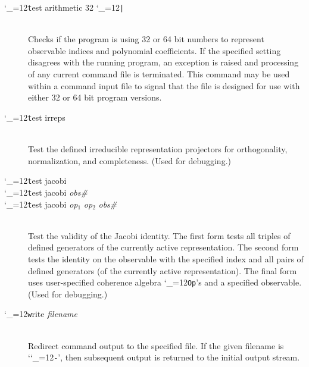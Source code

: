 \documentclass [12pt]{article}
\makeatletter
\renewcommand{\tt}{\begingroup\catcode`_=12\def\_{\string_}\tt@}
\newcommand{\tt@}[1]{\texttt{#1}\endgroup}
\makeatother
\begin{document}
\begin{description}
\item [\tt test arithmetic 32 \tt{|} 64]~\\
    Checks if the program is using 32 or 64 bit numbers
    to represent observable indices and polynomial coefficients.
    If the specified setting disagrees with the running program,
    an exception is raised and processing of any current command
    file is terminated.
    This command
    may be used within a command input file to signal that the file
    is designed for use with either 32 or 64 bit program versions.

\item [\tt test irreps]~\\
    Test the defined irreducible representation projectors for
    orthogonality, normalization, and completeness.
    (Used for debugging.)

\item [\tt test jacobi] \bgroup \itemsep 0pt \parskip 0pt
\item [\tt test jacobi {\it obs\#}]
\item [\tt test jacobi {\it op$_1$} {\it op$_2$} {\it obs\#}]~\\
    Test the validity of the Jacobi identity.
    The first form tests all triples of defined generators
    of the currently active representation.
    The second form tests the identity on the 
    observable with the specified index and all pairs
    of defined generators (of the currently active
    representation).
    The final form uses user-specified
    coherence algebra \tt{Op}'s and a specified observable.
    (Used for debugging.)
\egroup

\item [\tt write {\it filename}]~\\
    Redirect command output to the specified file.
    If the given filename is `\tt{-}', then subsequent
    output is returned to the initial output stream.

\end{description}

\pagebreak[2]
\end{document}
